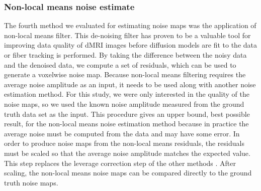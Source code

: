 \subsubsection{Non-local means noise estimate}
The fourth method we evaluated for estimating noise maps was the
application of non-local means filter\cite{Coupe_2008}. This
de-noising filter has proven to be a valuable tool for improving data
quality of dMRI images before diffusion models are fit to the data or
fiber tracking is performed. By taking the difference between the noisy
data and the denoised data, we compute a set of residuals, which can be
used to generate a voxelwise noise map. Because non-local means
filtering requires the average noise amplitude as an input, it needs to
be used along with another noise estimation method. For this study, we
were only interested in the quality of the noise maps, so we used the
known noise amplitude measured from the ground truth data set as the
input. This procedure gives an upper bound, best possible result, for
the non-local means noise estimation method because in practice the
average noise must be computed from the data and may have some error. In
order to produce noise maps from the non-local means residuals, the
residuals must be scaled so that the average noise amplitude matches the
expected value. This step replaces the leverage correction step of the
other methods \cite{davison1997bootstrap}.
After scaling, the non-local means noise maps can be compared directly
to the ground truth noise maps.
